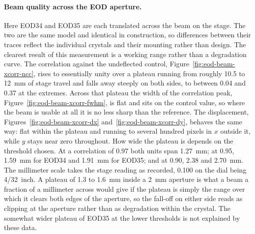 \documentclass{article}
\begin{document}
\paragraph{Beam quality across the EOD aperture.}
Here EOD34 and EOD35 are each translated across the beam on the stage. The two are the same
model and identical in construction, so differences between their traces reflect the individual
crystals and their mounting rather than design. The clearest result of this measurement is a
working range rather than a degradation curve. The
correlation against the undeflected control, Figure~\ref{fig:eod-beam-xcorr-ncc}, rises to
essentially unity over a plateau running from roughly 10.5 to 12~mm of stage travel and falls
away steeply on both sides, to between 0.04 and 0.37 at the extremes. Across that plateau the width
of the correlation peak, Figure~\ref{fig:eod-beam-xcorr-fwhm}, is flat and sits on the control
value, so where the beam is usable at all it is no less sharp than the reference. The
displacement, Figures~\ref{fig:eod-beam-xcorr-dx} and~\ref{fig:eod-beam-xcorr-dy}, behaves the
same way: flat within the plateau and running to several hundred pixels in $x$ outside it, while
$y$ stays near zero throughout. How wide the plateau is depends on the threshold chosen. At a
correlation of 0.97 both units span 1.27~mm; at 0.95, 1.59~mm for EOD34 and 1.91~mm for EOD35; and
at 0.90, 2.38 and 2.70~mm. The millimeter scale takes the stage reading as recorded, 0.100 on the
dial being 4/32~inch. A plateau of 1.3 to 1.6~mm inside a 2~mm aperture is what a beam a fraction
of a millimeter across would give if the plateau is simply the range over which it clears both
edges of the aperture, so the fall-off on either side reads as clipping at the aperture rather than
as degradation within the crystal. The somewhat wider plateau of EOD35 at the lower thresholds is
not explained by these data.
\end{document}
